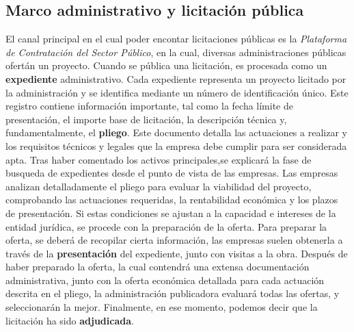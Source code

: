 \subsection{Marco administrativo y licitación pública}
El canal principal en el cual poder encontar licitaciones públicas es la \textit{Plataforma de Contratación del Sector Público}, en la cual, diversas administraciones públicas ofertán un proyecto. Cuando se pública una licitación, es procesada como un \textbf{expediente} administrativo.
Cada expediente representa un proyecto licitado por la administración y se identifica mediante un número de identificación único. Este registro contiene información importante, tal como la fecha límite de presentación, el importe base de licitación, la descripción técnica y, fundamentalmente, el \textbf{pliego}. Este documento detalla las actuaciones a realizar y los requisitos técnicos y legales que la empresa debe cumplir para ser considerada apta.
Tras haber comentado los activos principales,se explicará la fase de busqueda de expedientes desde el punto de vista de las empresas. Las empresas analizan detalladamente el pliego para evaluar la viabilidad del proyecto, comprobando las actuaciones requeridas, la rentabilidad económica y los plazos de presentación. Si estas condiciones se ajustan a la capacidad e intereses de la entidad jurídica, se procede con la preparación de la oferta.
Para preparar la oferta, se deberá de recopilar cierta información, las empresas suelen obtenerla a través de la \textbf{presentación} del expediente, junto con visitas a la obra. Después de haber preparado la oferta, la cual contendrá una extensa documentación administrativa, junto con la oferta económica detallada para cada actuación descrita en el pliego, la administración publicadora evaluará todas las ofertas, y seleccionarán la mejor. Finalmente, en ese momento, podemos decir que la licitación ha sido \textbf{adjudicada}.
